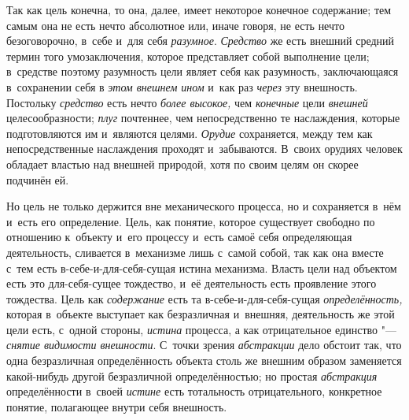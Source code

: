 Так как цель конечна, то она, далее, имеет некоторое конечное
содержание; тем самым она не есть нечто абсолютное или, иначе говоря, не
есть нечто безоговорочно, в~себе и~для себя
{\em разумное}.
{\em Средство} же есть
внешний средний термин того умозаключения, которое представляет собой
выполнение цели; в~средстве поэтому разумность цели являет себя как
разумность, заключающаяся в~сохранении себя в
{\em этом внешнем ином}
и~как раз {\em через}
эту внешность. Постольку
{\em средство} есть нечто
{\em более высокое,} чем
{\em конечные} цели
{\em внешней}
целесообразности;
{\em плуг} почтеннее, чем
непосредственно те наслаждения, которые подготовляются им и~являются
целями. {\em Орудие}
сохраняется, между тем как непосредственные наслаждения
проходят и~забываются. В~своих орудиях человек обладает властью над внешней
природой, хотя по своим целям он скорее подчинён ей.

Но цель не только держится вне механического процесса, но и
сохраняется в~нём и~есть его определение. Цель, как понятие, которое
существует свободно по отношению к~объекту и~его процессу и~есть самоё себя
определяющая деятельность, сливается в~механизме лишь с~самой собой, так
как она вместе с~тем есть в-себе-и-для-себя-сущая истина механизма. Власть
цели над объектом есть это для-себя-сущее тождество, и~её деятельность есть
проявление этого тождества. Цель как
{\em содержание} есть та
в-себе-и-для-себя-сущая
{\em определённость,}
которая в~объекте выступает как безразличная и~внешняя,
деятельность же этой цели есть, с~одной стороны,
{\em истина} процесса, а
как отрицательное единство "--- {\em снятие
видимости внешности}. С~точки зрения
{\em абстракции} дело
обстоит так, что одна безразличная определённость объекта столь же внешним
образом заменяется какой-нибудь другой безразличной определённостью; но
простая {\em абстракция}
определённости в~своей
{\em истине} есть
тотальность отрицательного, конкретное понятие, полагающее внутри себя
внешность.

